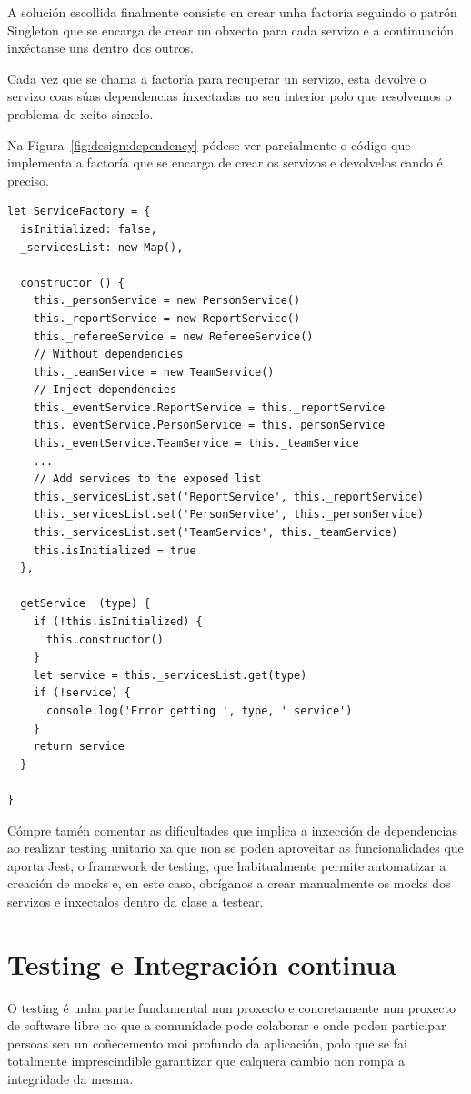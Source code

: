  A solución escollida finalmente consiste en crear unha factoría seguindo o 
patrón Singleton\cite{book:patterns} que se encarga de crear un obxecto para 
cada servizo e a continuación inxéctanse uns dentro dos outros.

  Cada vez que se chama a factoría para recuperar un servizo, esta
devolve o servizo coas súas dependencias inxectadas no seu interior polo que 
resolvemos o problema de xeito sinxelo.

  Na Figura~\ref{fig:design:dependency} pódese ver parcialmente o código que 
implementa a factoría que se encarga de crear os servizos e devolvelos cando é 
preciso.

    \lstset{}
    \begin{lstlisting}[caption=Fragmento da ServiceFactory., 
label=fig:design:dependency]
let ServiceFactory = {
  isInitialized: false,
  _servicesList: new Map(),

  constructor () {
    this._personService = new PersonService()
    this._reportService = new ReportService()
    this._refereeService = new RefereeService()
    // Without dependencies
    this._teamService = new TeamService()
    // Inject dependencies
    this._eventService.ReportService = this._reportService
    this._eventService.PersonService = this._personService
    this._eventService.TeamService = this._teamService
    ...
    // Add services to the exposed list
    this._servicesList.set('ReportService', this._reportService)
    this._servicesList.set('PersonService', this._personService)
    this._servicesList.set('TeamService', this._teamService)
    this.isInitialized = true
  },

  getService  (type) {
    if (!this.isInitialized) {
      this.constructor()
    }
    let service = this._servicesList.get(type)
    if (!service) {
      console.log('Error getting ', type, ' service')
    }
    return service
  }

}
    \end{lstlisting}

  Cómpre tamén comentar as dificultades que implica a inxección de dependencias 
ao realizar testing unitario xa que non se poden aproveitar as funcionalidades 
que aporta Jest, o framework de testing, que habitualmente permite automatizar 
a creación de mocks e, en este caso, obríganos a crear manualmente os mocks dos 
servizos e inxectalos dentro da clase a testear.

  \section{Testing e Integración continua}
  O testing é unha parte fundamental nun proxecto e concretamente nun proxecto 
de software libre no que a comunidade pode colaborar e onde poden 
participar persoas sen un coñecemento moi profundo da aplicación, polo que se 
fai totalmente imprescindible garantizar que calquera cambio non rompa a 
integridade da mesma.

